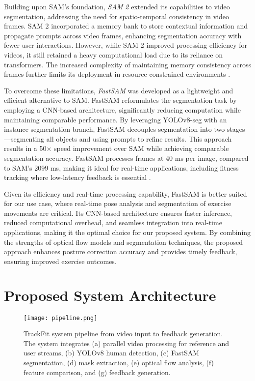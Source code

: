 \documentclass[conference]{IEEEtran}
\begin{document}
Building upon SAM's foundation, \textit{SAM 2} extended its capabilities to video segmentation, addressing the need for spatio-temporal consistency in video frames. SAM 2 incorporated a memory bank to store contextual information and propagate prompts across video frames, enhancing segmentation accuracy with fewer user interactions. However, while SAM 2 improved processing efficiency for videos, it still retained a heavy computational load due to its reliance on transformers. The increased complexity of maintaining memory consistency across frames further limits its deployment in resource-constrained environments \cite{sam2_2024}.  

To overcome these limitations, \textit{FastSAM} was developed as a lightweight and efficient alternative to SAM. FastSAM reformulates the segmentation task by employing a CNN-based architecture, significantly reducing computation while maintaining comparable performance. By leveraging YOLOv8-seg with an instance segmentation branch, FastSAM decouples segmentation into two stages—segmenting all objects and using prompts to refine results. This approach results in a 50× speed improvement over SAM while achieving comparable segmentation accuracy. FastSAM processes frames at 40 ms per image, compared to SAM's 2099 ms, making it ideal for real-time applications, including fitness tracking where low-latency feedback is essential \cite{fastsam2023}.  

Given its efficiency and real-time processing capability, FastSAM is better suited for our use case, where real-time pose analysis and segmentation of exercise movements are critical. Its CNN-based architecture ensures faster inference, reduced computational overhead, and seamless integration into real-time applications, making it the optimal choice for our proposed system. By combining the strengths of optical flow models and segmentation techniques, the proposed approach enhances posture correction accuracy and provides timely feedback, ensuring improved exercise outcomes.

\section{Proposed System Architecture}

\begin{figure*}[t] \centering \texttt{[image: pipeline.png]} \caption{TrackFit system pipeline from video input to feedback generation. The system integrates (a) parallel video processing for reference and user streams, (b) YOLOv8 human detection, (c) FastSAM segmentation, (d) mask extraction, (e) optical flow analysis, (f) feature comparison, and (g) feedback generation.} \label{fig:pipeline} \end{figure*}
\end{document}
